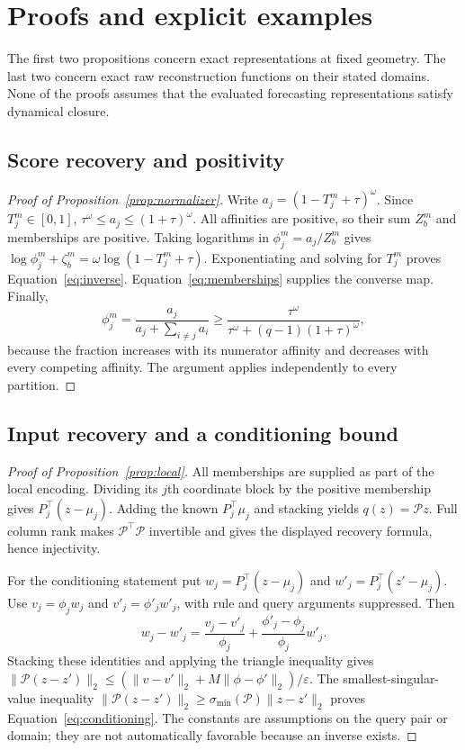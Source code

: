 \section{Proofs and explicit examples}\label{app:proofs}
The first two propositions concern exact representations at fixed geometry. The last two concern exact raw reconstruction functions on their stated domains. None of the proofs assumes that the evaluated forecasting representations satisfy dynamical closure.

\subsection{Score recovery and positivity}
\begin{proof}[Proof of Proposition~\ref{prop:normalizer}]
Write $a_j=(1-T_j^m+\tau)^\omega$. Since $T_j^m\in[0,1]$, $\tau^\omega\leq a_j\leq(1+\tau)^\omega$. All affinities are positive, so their sum $Z_b^m$ and memberships are positive. Taking logarithms in $\phi_j^m=a_j/Z_b^m$ gives
$\log\phi_j^m+\zeta_b^m=\omega\log(1-T_j^m+\tau)$.
Exponentiating and solving for $T_j^m$ proves Equation~\eqref{eq:inverse}. Equation~\eqref{eq:memberships} supplies the converse map. Finally,
\[
 \phi_j^m=\frac{a_j}{a_j+\sum_{i\ne j}a_i}
 \geq\frac{\tau^\omega}{\tau^\omega+(q-1)(1+\tau)^\omega},
\]
because the fraction increases with its numerator affinity and decreases with every competing affinity. The argument applies independently to every partition.
\end{proof}

\subsection{Input recovery and a conditioning bound}
\begin{proof}[Proof of Proposition~\ref{prop:local}]
All memberships are supplied as part of the local encoding. Dividing its $j$th coordinate block by the positive membership gives $P_j^\top(z-\mu_j)$. Adding the known $P_j^\top\mu_j$ and stacking yields $q(z)=\mathcal Pz$. Full column rank makes $\mathcal P^\top\mathcal P$ invertible and gives the displayed recovery formula, hence injectivity.

For the conditioning statement put $w_j=P_j^\top(z-\mu_j)$ and $w'_j=P_j^\top(z'-\mu_j)$. Use $v_j=\phi_jw_j$ and $v'_j=\phi'_jw'_j$, with rule and query arguments suppressed. Then
\[
 w_j-w'_j=\frac{v_j-v'_j}{\phi_j}
             +\frac{\phi'_j-\phi_j}{\phi_j}w'_j.
\]
Stacking these identities and applying the triangle inequality gives
$\|\mathcal P(z-z')\|_2\leq(\|v-v'\|_2+M\|\phi-\phi'\|_2)/\varepsilon$.
The smallest-singular-value inequality
$\|\mathcal P(z-z')\|_2\geq\sigma_{\min}(\mathcal P)\|z-z'\|_2$
proves Equation~\eqref{eq:conditioning}. The constants are assumptions on the query pair or domain; they are not automatically favorable because an inverse exists.
\end{proof}

